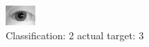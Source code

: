 \begin{figure}[h!]
\begin{center}
\includegraphics[width=0.60\columnwidth]{figures/ID1179_class_2_target_3.png}
\end{center}
\caption{ Classification: 2 actual target: 3}
\label{fig:ID1179_class_2_target_3}
\end{figure}
